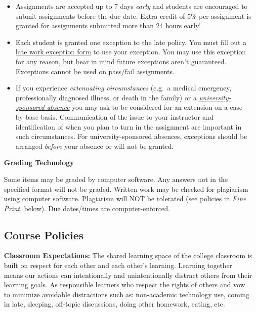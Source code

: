 \documentclass[]{tufte-book}
\providecommand{\tightlist}{%
  \setlength{\itemsep}{0pt}\setlength{\parskip}{0pt}}
\begin{document}
\begin{itemize}
\tightlist
\item
  Assignments are accepted up to 7 days \emph{early} and students are encouraged to submit assignments before the due date. Extra credit of 5\% per assignment is granted for assignments submitted more than 24 hours early!
\item
  Each student is granted one exception to the late policy. You must fill out a \href{https://forms.office.com/Pages/ResponsePage.aspx?id=WluzxdUWFESO4XvecFQ_GwFnoMNxJhxDhln9pQs53sVUOEMxSk9IWThGUExPNEEzTTlONTJXR1dSNS4u}{late work exception form} to use your exception. You may use this exception for any reason, but bear in mind future exceptions aren't guaranteed. Exceptions cannot be used on pass/fail assignments.
\item
  If you experience \emph{extenuating circumstances} (e.g.~a medical emergency, professionally diagnosed illness, or death in the family) or a \href{https://www.wcu.edu/experience/health-and-wellness/student-concern-response-team/absence-notification-protocol.aspx}{\emph{university-sponsored absence}} you may ask to be considered for an extension on a case-by-base basis. Communication of the issue to your instructor and identification of when you plan to turn in the assignment are important in such circumstances. For university-sponsored absences, exceptions should be arranged \emph{before} your absence or will not be granted.
\end{itemize}

\textbf{Grading Technology}

Some items may be graded by computer software. Any answers not in the specified format will not be graded. Written work may be checked for plagiarism using computer software. Plagiarism will NOT be tolerated (see policies in \emph{Fine Print}, below). Due dates/times are computer-enforced.

\hypertarget{course-policies}{%
\subsection*{Course Policies}\label{course-policies}}

\textbf{Classroom Expectations:} The shared learning space of the college classroom is built on respect for each other and each other's learning. Learning together means our actions can intentionally and unintentionally distract others from their learning goals. As responsible learners who respect the rights of others and vow to minimize avoidable distractions such as: non-academic technology use, coming in late, sleeping, off-topic discussions, doing other homework, eating, etc.
\end{document}
